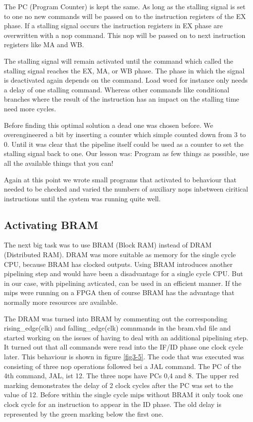 The PC (Program Counter) is kept the same. As long as the stalling signal is set to one no new commands will be passed on to the instruction registers of the EX phase. If a stalling signal occurs the instruction registers in EX phase are overwritten with a nop command. This nop will be passed on to next instruction registers like MA and WB.



The stalling signal will remain activated until the command which called the stalling signal reaches the EX, MA, or WB phase. The phase in which the signal is deactivated again depends on the command. Load word for instance only needs a delay of one stalling command. Whereas other commands like conditional branches where the result of the instruction has an impact on the stalling time need more cycles.

Before finding this optimal solution a dead one was chosen before. We overengineered a bit by inserting a counter which simple counted down from 3 to 0. Until it was clear that the pipeline itself could be used as a counter to set the stalling signal back to one. Our lesson was: Program as few things as possible, use all the available things that you can!

Again at this point we wrote small programs that activated to behaviour that needed to be checked and varied the numbers of auxiliary nops inbetween ciritical instructions until the system was running quite well.

\subsection{Activating BRAM}
\label{sec:activatingBRAM}

The next big task was to use BRAM (Block RAM) instead of DRAM (Distributed RAM). DRAM was more suitable as memory for the single cycle CPU, because BRAM has clocked outputs. Using BRAM introduces another pipelining step and would have been a disadvantage for a single cycle CPU. But in our case, with pipelining avticated, can be used in an efficient manner. If the mips were running on a FPGA then of course BRAM has the advantage that normally more resources are available.

The DRAM was turned into BRAM by commenting out the corresponding rising\_edge(clk) and falling\_edge(clk) comnmands in the bram.vhd file and started working on the issues of having to deal with an additional pipelining step. It turned out that all commands were read into the IF/ID phase one clock cycle later. This behaviour is shown in figure \ref{fig3-5}. The code that was executed was consisting of three nop operations followed bei a JAL command. The PC of the 4th command, JAL, ist 12. The three nops have PCs 0,4 and 8. The upper red marking demonstrates the delay of 2 clock cycles after the PC was set to the value of 12. Before within the single cycle mips without BRAM it only took one clock cycle for an instruction to appear in the ID phase. The old delay is represented by the green marking below the first one.

